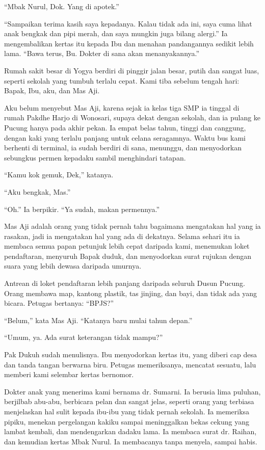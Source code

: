 \documentclass[11pt,twoside,openany]{book}
\makeatletter
\newcommand{\scenebreak}{\par\vspace{0.9em}{\centering\textsc{*\hspace{0.7em}*\hspace{0.7em}*}\par}\vspace{0.9em}\@afterindentfalse\@afterheading}
\makeatother
\begin{document}
``Mbak Nurul, Dok. Yang di apotek.''

``Sampaikan terima kasih saya kepadanya. Kalau tidak ada ini, saya cuma lihat anak bengkak dan pipi merah, dan saya mungkin juga bilang alergi.'' Ia mengembalikan kertas itu kepada Ibu dan menahan pandangannya sedikit lebih lama. ``Bawa terus, Bu. Dokter di sana akan menanyakannya.''

\scenebreak
Rumah sakit besar di Yogya berdiri di pinggir jalan besar, putih dan sangat luas, seperti sekolah yang tumbuh terlalu cepat. Kami tiba sebelum tengah hari: Bapak, Ibu, aku, dan Mas Aji.

Aku belum menyebut Mas Aji, karena sejak ia kelas tiga SMP ia tinggal di rumah Pakdhe Harjo di Wonosari, supaya dekat dengan sekolah, dan ia pulang ke Pucung hanya pada akhir pekan. Ia empat belas tahun, tinggi dan canggung, dengan kaki yang terlalu panjang untuk celana seragamnya. Waktu bus kami berhenti di terminal, ia sudah berdiri di sana, menunggu, dan menyodorkan sebungkus permen kepadaku sambil menghindari tatapan.

``Kamu kok gemuk, Dek,'' katanya.

``Aku bengkak, Mas.''

``Oh.'' Ia berpikir. ``Ya sudah, makan permennya.''

Mas Aji adalah orang yang tidak pernah tahu bagaimana mengatakan hal yang ia rasakan, jadi ia mengatakan hal yang ada di dekatnya. Selama sehari itu ia membaca semua papan petunjuk lebih cepat daripada kami, menemukan loket pendaftaran, menyuruh Bapak duduk, dan menyodorkan surat rujukan dengan suara yang lebih dewasa daripada umurnya.

Antrean di loket pendaftaran lebih panjang daripada seluruh Dusun Pucung. Orang membawa map, kantong plastik, tas jinjing, dan bayi, dan tidak ada yang bicara. Petugas bertanya: ``BPJS?''

``Belum,'' kata Mas Aji. ``Katanya baru mulai tahun depan.''

``Umum, ya. Ada surat keterangan tidak mampu?''

Pak Dukuh sudah menulisnya. Ibu menyodorkan kertas itu, yang diberi cap desa dan tanda tangan berwarna biru. Petugas memeriksanya, mencatat sesuatu, lalu memberi kami selembar kertas bernomor.

Dokter anak yang menerima kami bernama dr. Sumarni. Ia berusia lima puluhan, berjilbab abu-abu, berbicara pelan dan sangat jelas, seperti orang yang terbiasa menjelaskan hal sulit kepada ibu-ibu yang tidak pernah sekolah. Ia memeriksa pipiku, menekan pergelangan kakiku sampai meninggalkan bekas cekung yang lambat kembali, dan mendengarkan dadaku lama. Ia membaca surat dr. Raihan, dan kemudian kertas Mbak Nurul. Ia membacanya tanpa menyela, sampai habis.
\end{document}
